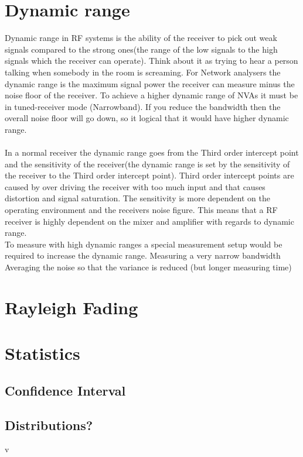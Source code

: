 \section{Dynamic range}
Dynamic range in RF systems is the ability of the receiver to pick out weak signals compared to the strong ones(the range of the low signals to the high signals which the receiver can operate). Think about it as trying to hear a person talking when somebody in the room is screaming. For Network analysers the dynamic range is the maximum signal power the receiver can measure minus the noise floor of the receiver. To achieve a higher dynamic range of NVAs it must be  in tuned-receiver mode (Narrowband). If you reduce the bandwidth then the overall noise floor will go down, so it logical that it would have higher dynamic range. \\\citep{AgilentNVA} \\
In a normal receiver the dynamic range goes from the Third order intercept point and the sensitivity of the receiver(the dynamic range is set by the sensitivity of the receiver to the Third order intercept point). Third order intercept points are caused by over driving the receiver with too much input and that causes distortion and signal saturation. The sensitivity is more dependent on the operating environment and the receivers noise figure. \citep{understandDynamic} This means that a RF receiver is highly dependent on the mixer and amplifier with regards to dynamic range.\\
To measure with high dynamic ranges a special measurement setup would be required to increase the dynamic range.
Measuring a very narrow bandwidth
Averaging the noise so that the variance is reduced (but longer measuring time)


\section{Rayleigh Fading}
\section{Statistics}
\subsection{Confidence Interval}
\subsection{Distributions?}v